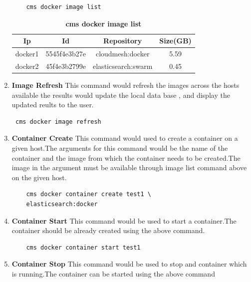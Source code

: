 \documentclass[9pt,twocolumn,twoside]{../../styles/osajnl}
\begin{document}
\begin{enumerate}
    \begin{verbatim}
    cms docker image list
    \end{verbatim}
    
    \begin{table}[h!]
     \caption{\bf cms docker image list }
     \begin{tabular}{cccc}
     \hline
      Ip & Id & Repository & Size(GB)\\
      \hline
      docker1 & 5545f4e3b27e & cloudmesh:docker & 5.59 \\
      docker2 & 45f4e3b2799e & elasticsearch:swarm & 0.45 \\
     \hline
     \end{tabular}
     \label{tab:tab2}
     \end{table}
     
    \item \textbf{Image Refresh} 
     This command would refresh the images across the hosts available
     the results would update the local data base , and display the
     updated reults to the user.

    \begin{verbatim} cms docker image refresh\end{verbatim}

    \item \textbf{Container Create}
     This command would used to create a container on a given host.The arguments for this command would be the name of the container and the image from which the container needs to be created.The image in the argument must be available through image list command above on the given host.\\
 
    \begin{verbatim}
    cms docker container create test1 \
    elasticsearch:docker
    \end{verbatim}
    
    \item \textbf{Container Start}
     This command would be used to start a container.The container
     should be already created using the above command. 

    \begin{verbatim}
    cms docker container start test1
    \end{verbatim}     
     
    \item \textbf{Container Stop}
     This command would be used to stop and container which is running.The container can be started using the above command


\end{enumerate}
\end{document}
